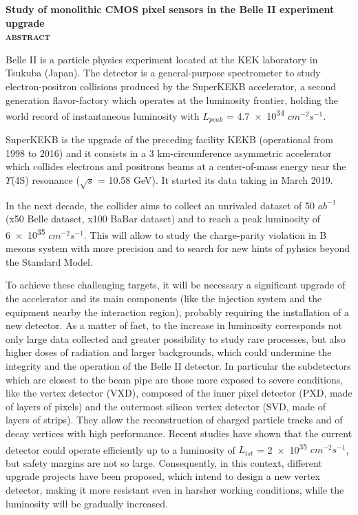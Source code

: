 \documentclass[10pt,a4paper,twoside]{report}
\begin{document}
\begin{center} \bfseries
\LARGE Study of monolithic CMOS pixel sensors in the Belle II experiment upgrade\\

\vspace{5mm}
\textsc{\large abstract}
\end{center}

Belle II is a particle physics experiment located at the KEK laboratory in Tsukuba (Japan). The detector is a general-purpose spectrometer to study electron-positron collisions produced by the SuperKEKB accelerator, a second generation flavor-factory which operates at the luminosity frontier, holding the world record of instantaneous luminosity with $L_{peak}$ = \num{4.7e34} $cm^{-2} s^{-1}$. 

SuperKEKB is the upgrade of the preceding facility KEKB (operational from 1998 to 2016) and it consists in a 3 km-circumference asymmetric accelerator which collides electrons and positrons beams at a center-of-mass energy near the $\Upsilon$(4S) resonance ($\sqrt{s}$ = 10.58 GeV). It started its data taking in March 2019.

In the next decade, the collider aims to collect  an unrivaled dataset of 50 $ab^{-1}$ (x50 Belle dataset, x100 BaBar dataset) and to reach a peak luminosity of \num{6e35} $cm^{-2} s^{-1}$. This will allow to study the charge-parity violation in B mesons system with more precision and to search for new hints of pyhsics beyond the Standard Model.

To achieve these challenging targets, it will be necessary a significant upgrade of the accelerator and its main components (like the injection system and the equipment nearby the interaction region), probably requiring the installation of a new detector. As a matter of fact, to the increase in luminosity corresponds not only large data collected and greater possibility to study rare processes, but also higher doses of radiation and larger backgrounds, which could undermine the integrity and the operation of the Belle II detector.
In particular the subdetectors which are closest to the beam pipe are those more exposed to severe conditions, like the vertex detector (VXD), composed of the inner pixel detector (PXD, made of layers of pixels) and the outermost silicon vertex detector (SVD, made of layers of strips). They allow the reconstruction of charged particle tracks and of decay vertices with high performance. Recent studies have shown that the current detector could operate efficiently up to a luminosity of $L_{ist}$ = \num{2e35} $cm^{-2} s^{-1}$, but safety margins are not so large. 
Consequently, in this context, different upgrade projects have been proposed, which intend to design a new vertex detector, making it more resistant even in harsher working conditions, while the luminosity will be gradually increased. 
\end{document}
